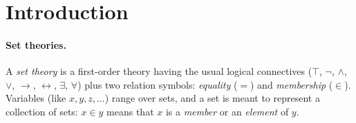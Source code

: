 \documentclass[sigplan,10pt,anonymous,review]{acmart}%
\begin{document}



\maketitle

\section{Introduction}


\paragraph{Set theories.}
A \emph{set theory} is a first-order theory having the usual logical connectives ($\top$, $\neg$, $\land$, $\lor$, $\to$, $\leftrightarrow$, $\exists$, $\forall$) plus two relation symbols: \emph{equality} ($=$) and \emph{membership} ($\in$). Variables (like $x,y,z,\ldots$) range over sets, and a set is meant to represent a collection of sets: $x \in y$ means that $x$ is a \emph{member} or an \emph{element} of $y$.
\end{document}
